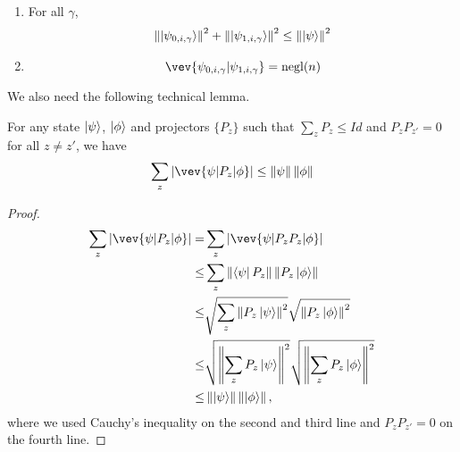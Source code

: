 \begin{lemma}
\begin{enumerate}
\item \label{property-partition-norm-sum}
  For all $\gamma$, 
  \begin{align}
    \left\lVert\ket{\psi_{0,i,\gamma}}\right\rVert^2+ \left\lVert\ket{\psi_{1,i,\gamma}}\right\rVert^2 \leq  \left\lVert\ket{\psi}\right\rVert^2 
\end{align}

  
\item {}

$$\vev{\psi_{0,i,\gamma}|\psi_{1,i,\gamma}} = \negl(n)$$
 


\end{enumerate}
\end{lemma}








We also need the following technical lemma.
\begin{lemma}\label{lem:samp-tech}
For any state $\ket{\psi}$,  $\ket{\phi}$ and projectors $\{P_z\}$ such that $\sum_z P_z \leq Id$ and $P_z P_{z'} =0 $ for all $z\neq z'$, we have
$$  \sum_z |\vev{\psi|P_z|\phi}| \leq \norm{\psi}\norm{\phi} $$
\end{lemma}
\begin{proof}
\begin{align}
    \sum_z |\vev{\psi|P_z|\phi}| =&\sum_z|\vev{\psi|P_zP_z|\phi}| \nn \\
    \leq& \sum_z \norm{\bra{\psi}P_z} \norm{ P_z\ket{\phi}}  \nn \\ \leq&  \sqrt{\sum_z \norm{P_z\ket{\psi}}^2} \sqrt{\norm{ P_z\ket{\phi}}^2}     \nn \\
    \leq& \sqrt{\norm{\sum_z P_z\ket{\psi}}^2 } \sqrt{\norm{\sum_z P_z\ket{\phi}}^2 } \nn \\
    \leq & \norm{\ket{\psi}}\norm{\ket{\phi}},
\end{align}
where we used Cauchy's inequality on the second and third line and $P_z P_{z'} =0 $ on the fourth line.
\end{proof}



